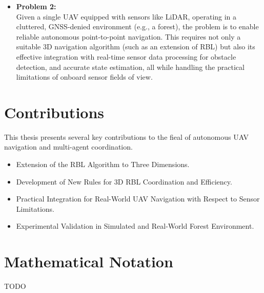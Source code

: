 \begin{enumerate}
      \begin{itemize}
        \item \textbf{Problem 2: } \\
        Given a single \ac{UAV} equipped with sensors like \ac{LiDAR}, operating in a cluttered, GNSS-denied environment (e.g., a forest), the problem is to enable reliable autonomous point-to-point navigation. 
        This requires not only a suitable 3D navigation algorithm (such as an extension of \ac{RBL}) but also its effective integration with real-time sensor data processing for obstacle detection, and accurate state estimation, all while handling the practical limitations of onboard sensor fields of view.
      \end{itemize}
  \end{enumerate}

\section{Contributions}
  This thesis presents several key contributions to the fieal of autonomous \ac{UAV} navigation and multi-agent coordination.
  \begin{itemize}
    \item Extension of the \ac{RBL} Algorithm to Three Dimensions.
    \item Development of New Rules for 3D \ac{RBL} Coordination and Efficiency.
    \item Practical Integration for Real-World \ac{UAV} Navigation with Respect to Sensor Limitations.
    \item Experimental Validation in Simulated and Real-World Forest Environment.
  \end{itemize}

\section{Mathematical Notation}

TODO

